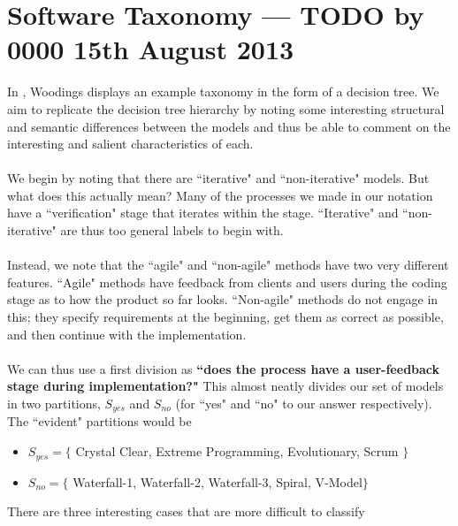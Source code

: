 \section{Software Taxonomy --- TODO by 0000 15th August 2013} \label{taxonomy}

In \cite{Woodings2013Tut1}, Woodings displays an example taxonomy in the form of
a decision tree.
We aim to replicate the decision tree hierarchy by noting some interesting
structural and semantic differences between the models and thus be able to
comment on the interesting and salient characteristics of each.\\
\\
We begin by noting that there are ``iterative" and ``non-iterative" models.
But what does this actually mean?
Many of the processes we made in our notation have a ``verification" stage that
iterates within the stage.
``Iterative" and ``non-iterative" are thus too general labels to begin with.\\
\\
Instead, we note that the ``agile" and ``non-agile" methods have two very
different features.
``Agile" methods have feedback from clients and users during the coding stage as
to how the product so far looks.
``Non-agile" methods do not engage in this; they specify requirements at the
beginning, get them as correct as possible, and then continue with the
implementation.\\
\\
We can thus use a first division as {\bf ``does the process have a user-feedback
stage during implementation?"}
This almost neatly divides our set of models in two partitions, $S_{yes}$ and
$S_{no}$ (for ``yes" and ``no" to our answer respectively).
The ``evident" partitions would be
\begin{itemize}
  \item $S_{yes} = \{$ Crystal Clear, Extreme Programming, Evolutionary, Scrum $\}$
  \item $S_{no} = \{$ Waterfall-1, Waterfall-2, Waterfall-3, Spiral, V-Model$\}$
\end{itemize}
There are three interesting cases that are more difficult to classify
